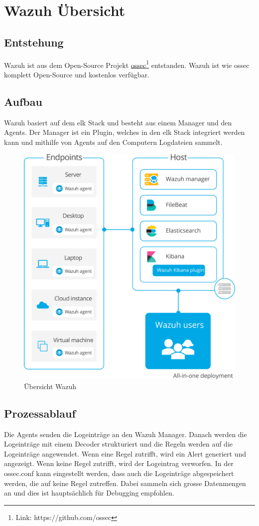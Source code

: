 \chapter{Wazuh Übersicht}
\section{Entstehung}
Wazuh ist aus dem Open-Source Projekt \href{https://github.com/ossec}{ossec}\footnote{Link: https://github.com/ossec} entstanden.
Wazuh ist wie ossec komplett Open-Source und kostenlos verfügbar.

\section{Aufbau}
Wazuh basiert auf dem \acrfull{elk} Stack und besteht aus einem Manager und den Agents. 
Der Manager ist ein Plugin, welches in den \acrshort{elk} Stack integriert werden kann und mithilfe von Agents auf den Computern Logdateien sammelt.

\begin{figure}[H]
    \centering
    \includegraphics[width=0.5\linewidth]{../img/aufbau-wazuh.png}
    \caption[Übersicht Wazuh]{Übersicht Wazuh\footnotemark}
\end{figure}


\section{Prozessablauf}
Die Agents senden die Logeinträge an den Wazuh Manager.
Danach werden die Logeinträge mit einem Decoder strukturiert und die Regeln werden auf die Logeinträge angewendet.
Wenn eine Regel zutrifft, wird ein Alert generiert und angezeigt.
Wenn keine Regel zutrifft, wird der Logeintrag verworfen.
In der ossec.conf kann eingestellt werden, dass auch die Logeinträge abgespeichert werden, die auf keine Regel zutreffen.
Dabei sammeln sich grosse Datenmengen an und dies ist hauptsächlich für Debugging empfohlen.

